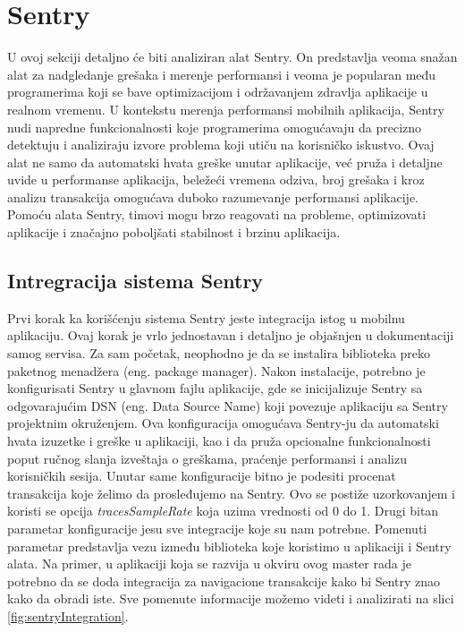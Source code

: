 \documentclass[12pt,oneside]{memoir}
\begin{document}
\section{Sentry}

U ovoj sekciji detaljno će biti analiziran alat Sentry. On predstavlja veoma snažan alat za nadgledanje grešaka i merenje performansi i veoma je popularan među programerima koji se bave optimizacijom i održavanjem zdravlja aplikacije u realnom vremenu. U kontekstu merenja performansi mobilnih aplikacija, Sentry nudi napredne funkcionalnosti koje programerima omogućavaju da precizno detektuju i analiziraju izvore problema koji utiču na korisničko iskustvo. Ovaj alat ne samo da automatski hvata greške unutar aplikacije, već pruža i detaljne uvide u performanse aplikacija, beležeći vremena odziva, broj grešaka i kroz analizu transakcija omogućava duboko razumevanje performansi aplikacije. Pomoću alata Sentry, timovi mogu brzo reagovati na probleme, optimizovati aplikacije i značajno poboljšati stabilnost i brzinu aplikacija.

\subsection{Intregracija sistema Sentry}

Prvi korak ka korišćenju sistema Sentry jeste integracija istog u mobilnu aplikaciju. Ovaj korak je vrlo jednostavan i detaljno je objašnjen u dokumentaciji samog servisa. Za sam početak, neophodno je da se instalira biblioteka preko paketnog menadžera (eng. package manager). Nakon instalacije, potrebno je konfigurisati Sentry u glavnom fajlu aplikacije, gde se inicijalizuje Sentry sa odgovarajućim DSN (eng. Data Source Name) koji povezuje aplikaciju sa Sentry projektnim okruženjem. Ova konfiguracija omogućava Sentry-ju da automatski hvata izuzetke i greške u aplikaciji, kao i da pruža opcionalne funkcionalnosti poput ručnog slanja izveštaja o greškama, praćenje performansi i analizu korisničkih sesija. Unutar same konfiguracije bitno je podesiti procenat transakcija koje želimo da prosleđujemo na Sentry. Ovo se postiže uzorkovanjem i koristi se opcija \textit{tracesSampleRate} koja uzima vrednosti od 0 do 1. Drugi bitan parametar konfiguracije jesu sve integracije koje su nam potrebne. Pomenuti parametar predstavlja vezu između biblioteka koje koristimo u aplikaciji i Sentry alata. Na primer, u aplikaciji koja se razvija u okviru ovog master rada je potrebno da se doda integracija za navigacione transakcije kako bi Sentry znao kako da obradi iste. Sve pomenute informacije možemo videti i analizirati na slici \ref{fig:sentryIntegration}.
\end{document}
